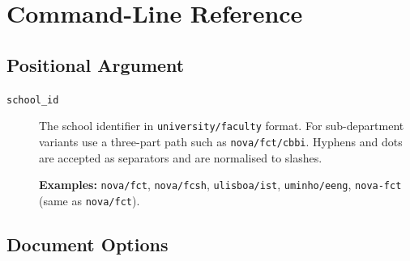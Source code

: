 \section{Command-Line Reference}
\label{sec:buildpy_reference}

\subsection{Positional Argument}
\label{sec:buildpy_positional}

\begin{description}
  \item[\texttt{school\_id}]
        The school identifier in \texttt{university/faculty} format.  For
        sub-department variants use a three-part path such as
        \texttt{nova/fct/cbbi}.  Hyphens and dots are accepted as separators
        and are normalised to slashes.

        \textbf{Examples:}
        \verb!nova/fct!, \verb!nova/fcsh!, \verb!ulisboa/ist!,
        \verb!uminho/eeng!, \verb!nova-fct! (same as \verb!nova/fct!).
\end{description}

\subsection{Document Options}
\label{sec:buildpy_doc_opts}

